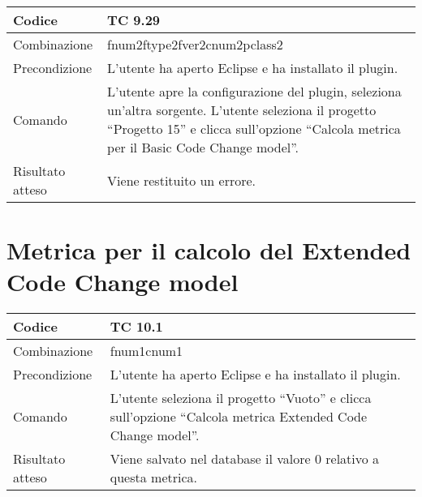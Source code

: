 \begin{table}[ht]
\begin{tabular}{|p{3cm}|p{9cm}|}
\hline
\cellcolor{lightgray}Codice				& TC 9.29								\\
\hline
\cellcolor{lightgray}Combinazione		& fnum2ftype2fver2cnum2pclass2									\\
\hline
\cellcolor{lightgray}Precondizione		& L'utente ha aperto Eclipse e ha installato il plugin.		\\
\hline
\cellcolor{lightgray}Comando			& L'utente apre la configurazione del plugin, seleziona un'altra sorgente. L'utente seleziona il progetto ``Progetto 15''  e clicca sull'opzione ``Calcola metrica per il Basic Code Change model''.	\\
\hline
\cellcolor{lightgray}Risultato atteso	& Viene restituito un errore.\\
\hline
\end{tabular}
\end{table}

\clearpage

\section{Metrica per il calcolo del Extended Code Change model}

\begin{table}[ht]
\begin{tabular}{|p{3cm}|p{9cm}|}
\hline
\cellcolor{lightgray}Codice				& TC 10.1								\\
\hline
\cellcolor{lightgray}Combinazione		& fnum1cnum1									\\
\hline
\cellcolor{lightgray}Precondizione		& L'utente ha aperto Eclipse e ha installato il plugin.		\\
\hline
\cellcolor{lightgray}Comando			& L'utente seleziona il progetto ``Vuoto''  e clicca sull'opzione ``Calcola metrica Extended Code Change model''.	\\
\hline
\cellcolor{lightgray}Risultato atteso	& Viene salvato nel database il valore 0 relativo a questa metrica.\\
\hline
\end{tabular}
\end{table}


